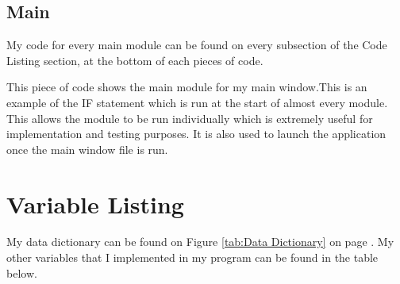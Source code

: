 \subsection{Main}

My code for every main module can be found on every subsection of the Code Listing section, at the bottom of each pieces of code.


This piece of code shows the main module for my main window.This is an example of the IF statement which is run at the start of almost every module. This allows the module to be run individually which is extremely useful for implementation and testing purposes. It is also used to launch the application once the main window file is run.









\section{Variable Listing}

My data dictionary can be found on Figure \ref{tab:Data Dictionary} on page \pageref{tab:Data Dictionary}. My other variables that I implemented in my program can be found in the table below.

